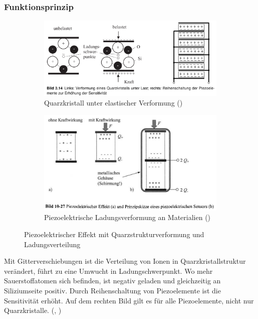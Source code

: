 \documentclass[12pt]{article}
\begin{document}
\subsubsection{Funktionsprinzip}

\begin{figure}[h!]
  \centering
  \begin{subfigure}[b]{0.45\linewidth}
    \includegraphics[width=\linewidth]{piezoelektrischerEffektquarz}
    \caption{Quarzkristall unter elastischer Verformung (\cite{Heimann.})}
  \end{subfigure}
  \begin{subfigure}[b]{0.45\linewidth}
    \includegraphics[width=\linewidth]{piezoelektrischerEffekt}
    \caption{Piezoelektrische Ladungsverformung an Materialien (\cite{Parthier.2006})}
  \end{subfigure}
  \caption{Piezoelektrischer Effekt mit Quarzstrukturverformung und Ladungsverteilung}
  \label{fig:piezoeffekt}
\end{figure}

Mit Gitterverschiebungen ist die Verteilung von Ionen in Quarzkristallstruktur verändert, führt zu eine Umwucht in Ladungschwerpunkt. Wo mehr Sauerstoffatomen sich befinden, ist negativ geladen und gleichzeitig an Siliziumseite positiv. Durch Reihenschaltung von Piezoelemente ist die Sensitivität erhöht. Auf dem rechten Bild gilt es für alle Piezoelemente, nicht nur Quarzkristalle. (\cite{Heimann.}, \cite{Parthier.2019})
\end{document}
